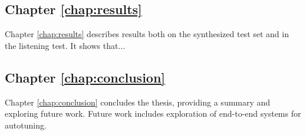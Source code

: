 \subsection{Chapter \ref{chap:results}}
Chapter \ref{chap:results} describes results both on the synthesized test set and in the listening test. It shows that...

\subsection{Chapter \ref{chap:conclusion}}
Chapter \ref{chap:conclusion} concludes the thesis, providing a summary and exploring future work. Future work includes exploration of end-to-end systems for autotuning. 




